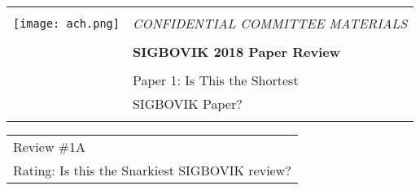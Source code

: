 \documentclass[12pt]{article}
\begin{document}
{\sffamily
\begin{tabular}{ll}
\multirow{3}{*}{\texttt{[image: ach.png]}}\\
& \Large{\em CONFIDENTIAL COMMITTEE MATERIALS} \\
&\\
& \textbf{\Huge{SIGBOVIK 2018 Paper Review}} \\
&\\
& \LARGE{Paper 1: Is This the Shortest} \\[0.25em]
& \LARGE{SIGBOVIK Paper?} \\
&\\
\hline
\end{tabular}}
\vspace{2em}
\thispagestyle{empty}

{\large\bf
\begin{tabular}{l}
Review \#1A \\
Rating: Is this the Snarkiest SIGBOVIK review?
\end{tabular}}
\vspace{1em}
\end{document}
